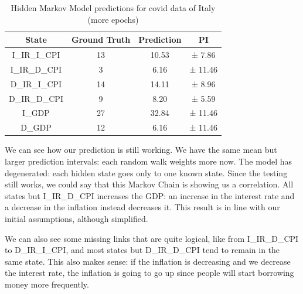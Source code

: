 \begin{table}[H]
  \centering
  \begin{tabular}{|c|c|c|c|}
    \hline
    State         & Ground Truth & Prediction & PI      \\
    \hline
    I\_IR\_I\_CPI & 13           & 10.53      & ± 7.86  \\
    I\_IR\_D\_CPI & 3            & 6.16       & ± 11.46 \\
    D\_IR\_I\_CPI & 14           & 14.11      & ± 8.96  \\
    D\_IR\_D\_CPI & 9            & 8.20       & ± 5.59  \\
    I\_GDP        & 27           & 32.84      & ± 11.46 \\
    D\_GDP        & 12           & 6.16       & ± 11.46 \\
    \hline
  \end{tabular}
  \label{tab:italy_covid_degen}
  \caption{Hidden Markov Model predictions for covid data of Italy (more epochs)}
\end{table}
We can see how our prediction is still working. We have the same mean but larger prediction intervals: each random walk weights more now. The model has degenerated: each hidden state goes only to one known state. Since the testing still works, we could say that this Markov Chain is showing us a correlation. All states but I\_IR\_D\_CPI increases the GDP: an increase in the interest rate and a decrease in the inflation instead decreases it. This result is in line with our initial assumptions, although simplified.

We can also see some missing links that are quite logical, like from I\_IR\_D\_CPI to D\_IR\_I\_CPI, and most states but D\_IR\_D\_CPI tend to remain in the same state. This also makes sense: if the inflation is decreasing and we decrease the interest rate, the inflation is going to go up since people will start borrowing money more frequently.
